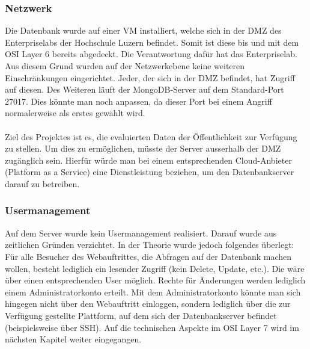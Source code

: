 \documentclass[12pt,titlepage]{article}
\begin{document}
\subsubsection{Netzwerk}
Die Datenbank wurde auf einer VM installiert, welche sich in der DMZ des Enterpriselabs der Hochschule Luzern befindet. Somit ist diese bis und mit dem OSI Layer 6 bereits abgedeckt. Die Verantwortung dafür hat das Enterpriselab. Aus diesem Grund wurden auf der Netzwerkebene keine weiteren Einschränkungen eingerichtet. Jeder, der sich in der DMZ befindet, hat Zugriff auf diesen. Des Weiteren läuft der MongoDB-Server auf dem Standard-Port 27017. Dies könnte man noch anpassen, da dieser Port bei einem Angriff normalerweise als erstes gewählt wird. \\
\\
Ziel des Projektes ist es, die evaluierten Daten der Öffentlichkeit zur Verfügung zu stellen. Um dies zu ermöglichen, müsste der Server ausserhalb der DMZ zugänglich sein. Hierfür würde man bei einem entsprechenden Cloud-Anbieter (Platform as a Service) eine Dienstleistung beziehen, um den Datenbankserver darauf zu betreiben.

\subsubsection{Usermanagement}
Auf dem Server wurde kein Usermanagement realisiert. Darauf wurde aus zeitlichen Gründen verzichtet. In der Theorie wurde jedoch folgendes überlegt: Für alle Besucher des Webauftrittes, die Abfragen auf der Datenbank machen wollen, besteht lediglich ein lesender Zugriff (kein Delete, Update, etc.). Die wäre über einen entsprechenden User möglich. Rechte für Änderungen werden lediglich einem Administratorkonto erteilt. Mit dem Administratorkonto könnte man sich hingegen nicht über den Webauftritt einloggen, sondern lediglich über die zur Verfügung gestellte Plattform, auf dem sich der Datenbankserver befindet (beispielsweise über SSH). Auf die technischen Aspekte im OSI Layer 7 wird im nächsten Kapitel weiter eingegangen. 
\end{document}
